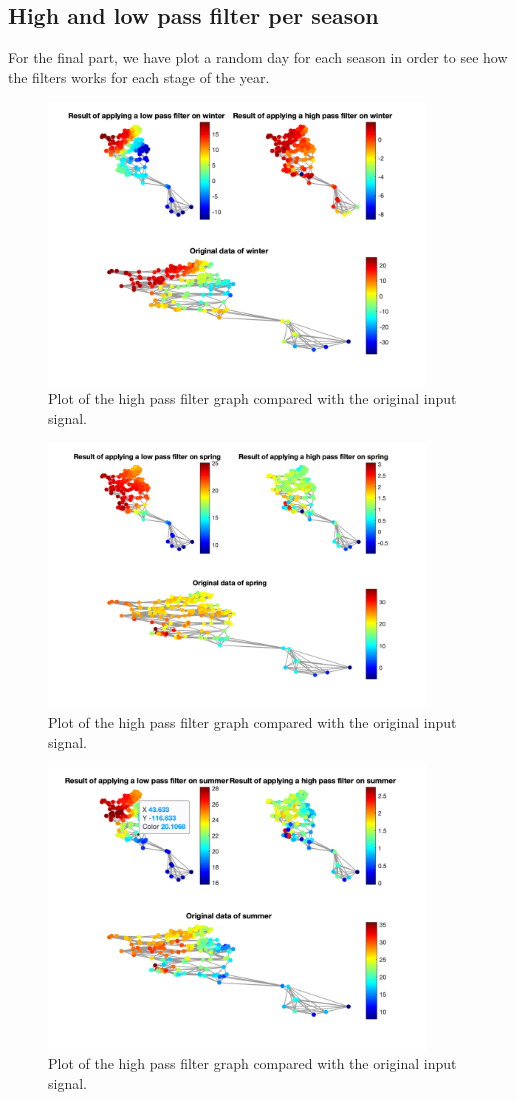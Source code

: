 \documentclass[12pt]{article}
\begin{document}
\subsection{High and low pass filter per season }
For the final part, we have plot a random day for each season in order to see how the filters works for each stage of the year.
\begin{figure}[H]
	\centering
	\includegraphics[width=10cm]{images/7.png}
	\caption{Plot of the high pass filter graph compared with the original input signal.}
	\label{fig:lowpassfilterrandom}
\end{figure}
\begin{figure}[H]
	\centering
	\includegraphics[width=10cm]{images/8.png}
	\caption{Plot of the high pass filter graph compared with the original input signal.}
	\label{fig:lowpassfilterrandom}
\end{figure}
\begin{figure}[H]
	\centering
	\includegraphics[width=10cm]{images/9.png}
	\caption{Plot of the high pass filter graph compared with the original input signal.}
	\label{fig:lowpassfilterrandom}
\end{figure}
\end{document}
